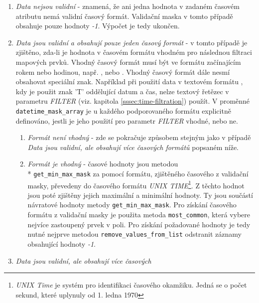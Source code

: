 \begin{enumerate}
\item\textit{Data nejsou validní} - znamená, že ani jedna
hodnota v zadaném časovém atributu nemá validní časový
formát. Validační maska v tomto případě obsahuje pouze hodnoty
\textit{-1}. Výpočet je tedy ukončen.
\item\textit{Data jsou validní a obsahují pouze jeden časový
formát} - v tomto případě je zjištěno, zda-li je hodnota v časovém formátu 
vhodném pro následnou filtraci mapových prvků. Vhodný časový formát 
musí být ve formátu 
začínajícím rokem nebo hodinou, např. , nebo . 
Vhodný časový formát dále nesmí obsahovat speciální znak. 
Například při použití data v textovém formátu
, kdy je použit znak 'T' oddělující
datum a čas, nelze textový řetězec v parametru
\textit{FILTER} (viz. kapitola \ref{sssec:time-filtration})
použít.
V proměnné \verb|datetime_mask_array| je u každého 
podporovaného formátu explicitně definováno, jestli je jeho použití pro 
parametr \textit{FILTER} vhodné, nebo ne.
\begin{enumerate}
\item\textit{Formát není vhodný} - zde se pokračuje
způsobem stejným jako v případě \textit{Data jsou
validní, ale obsahují více časových formátů} popsaném
níže. 
\item\textit{Formát je vhodný} - časové hodnoty
jsou metodou \\* \verb|get_min_max_mask| za pomocí formátu,
zjištěného časového z validační masky, převedeny do
časového formátu \textit{UNIX TIME}\footnote{\textit{UNIX Time} 
je systém pro identifikaci časového okamžiku. Jedná se o počet 
sekund, které uplynuly od 1. ledna 1970}. Z těchto hodnot
jsou poté zjištěny jejich maximální a minimální
hodnoty. Ty jsou součástí návratové hodnoty metody
\verb|get_min_max_mask|.
Pro získání časového formátu z validační masky je
použita metoda \verb|most_common|, která vybere nejvíce
zastoupený prvek v poli. Pro získání požadované hodnoty
je tedy nutné nejprve metodou \verb|remove_values_from_list|
odstranit záznamy obsahující hodnoty \textit{-1}.
\end{enumerate}
\item\textit{Data jsou validní, ale obsahují více časových
}
\end{enumerate}
